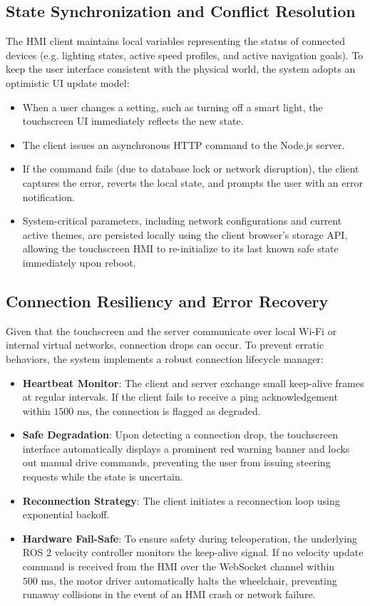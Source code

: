 \subsection{State Synchronization and Conflict Resolution}
The HMI client maintains local variables representing the status of connected devices (e.g. lighting states, active speed profiles, and active navigation goals). To keep the user interface consistent with the physical world, the system adopts an optimistic UI update model:
\begin{itemize}
    \item When a user changes a setting, such as turning off a smart light, the touchscreen UI immediately reflects the new state.
    \item The client issues an asynchronous HTTP command to the Node.js server.
    \item If the command fails (due to database lock or network disruption), the client captures the error, reverts the local state, and prompts the user with an error notification.
    \item System-critical parameters, including network configurations and current active themes, are persisted locally using the client browser's storage API, allowing the touchscreen HMI to re-initialize to its last known safe state immediately upon reboot.
\end{itemize}

\subsection{Connection Resiliency and Error Recovery}
Given that the touchscreen and the server communicate over local Wi-Fi or internal virtual networks, connection drops can occur. To prevent erratic behaviors, the system implements a robust connection lifecycle manager:
\begin{itemize}
    \item \textbf{Heartbeat Monitor}: The client and server exchange small keep-alive frames at regular intervals. If the client fails to receive a ping acknowledgement within $1500\text{ ms}$, the connection is flagged as degraded.
    \item \textbf{Safe Degradation}: Upon detecting a connection drop, the touchscreen interface automatically displays a prominent red warning banner and locks out manual drive commands, preventing the user from issuing steering requests while the state is uncertain.
    \item \textbf{Reconnection Strategy}: The client initiates a reconnection loop using exponential backoff.
    \item \textbf{Hardware Fail-Safe}: To ensure safety during teleoperation, the underlying ROS 2 velocity controller monitors the keep-alive signal. If no velocity update command is received from the HMI over the WebSocket channel within $500\text{ ms}$, the motor driver automatically halts the wheelchair, preventing runaway collisions in the event of an HMI crash or network failure.
\end{itemize}

